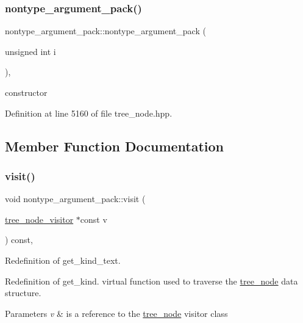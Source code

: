 \subsubsection{\texorpdfstring{nontype\+\_\+argument\+\_\+pack()}{nontype\_argument\_pack()}}
{\footnotesize\ttfamily nontype\+\_\+argument\+\_\+pack\+::nontype\+\_\+argument\+\_\+pack (\begin{DoxyParamCaption}\item[{unsigned int}]{i }\end{DoxyParamCaption})\hspace{0.3cm}{\ttfamily [inline]}, {\ttfamily [explicit]}}



constructor 



Definition at line 5160 of file tree\+\_\+node.\+hpp.



\subsection{Member Function Documentation}
\mbox{\label{structnontype__argument__pack_a254f0396e0ad2b47a793f8cb7f5b233a}} 
\subsubsection{\texorpdfstring{visit()}{visit()}}
{\footnotesize\ttfamily void nontype\+\_\+argument\+\_\+pack\+::visit (\begin{DoxyParamCaption}\item[{\hyperlink{classtree__node__visitor}{tree\+\_\+node\+\_\+visitor} $\ast$const}]{v }\end{DoxyParamCaption}) const\hspace{0.3cm}{\ttfamily [override]}, {\ttfamily [virtual]}}



Redefinition of get\+\_\+kind\+\_\+text. 

Redefinition of get\+\_\+kind. virtual function used to traverse the \hyperlink{classtree__node}{tree\+\_\+node} data structure. 
\begin{DoxyParams}{Parameters}
{\em v} & is a reference to the \hyperlink{classtree__node}{tree\+\_\+node} visitor class \\
\hline
\end{DoxyParams}


